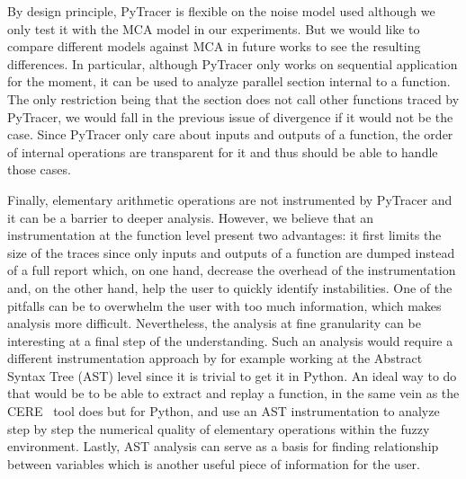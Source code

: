\documentclass[11pt]{article}
\newcommand{\pytracer}[0]{PyTracer\xspace}
\begin{document}
By design principle, \pytracer is flexible on the noise model used although we only test it with the MCA model in our experiments.
But we would like to compare different models against MCA in future works to see the resulting differences. 
In particular, although \pytracer only works 
on sequential application for the moment, it can be used to analyze parallel section internal to a function.
The only restriction being that the section does not call other functions traced by \pytracer, 
we would fall in the previous issue of divergence if it would not be the case.
Since \pytracer only care about inputs and outputs of a function, the order of internal operations are transparent for it
and thus should be able to handle those cases.

Finally, elementary arithmetic operations are not instrumented by \pytracer and it can be a barrier to deeper analysis.
However, we believe that an instrumentation at the function level present two advantages:
it first limits the size of the traces since only inputs and outputs of a function are dumped instead 
of a full report which, on one hand, decrease the overhead of the instrumentation and, on the other hand,
help the user to quickly identify instabilities. One of the pitfalls can be to overwhelm the user with too much information, 
which makes analysis more difficult. Nevertheless, the analysis at fine granularity can be interesting 
at a final step of the understanding. Such an analysis would require a different instrumentation approach
by for example working at the Abstract Syntax Tree (AST) level since it is trivial to get it in Python.
An ideal way to do that would be to be able to extract and replay a function,
in the same vein as the CERE~\cite{castro2015cere} tool does but for Python, and use an AST instrumentation to analyze step by step 
the numerical quality of elementary operations within the fuzzy environment.
Lastly, AST analysis can serve as a basis for finding relationship between variables which is another useful 
piece of information for the user.
\end{document}
